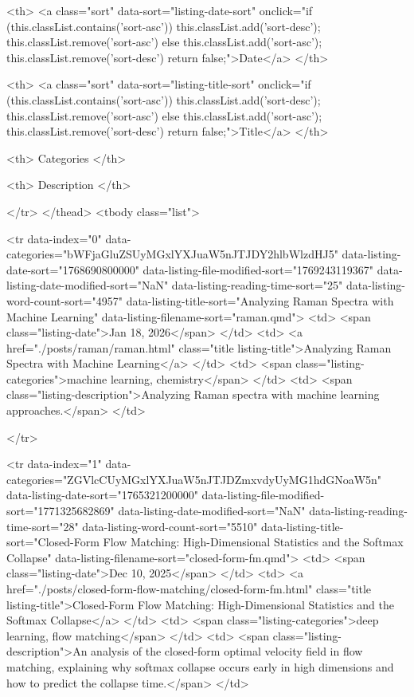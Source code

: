 <th>
<a class="sort" data-sort="listing-date-sort" onclick="if (this.classList.contains('sort-asc')) { this.classList.add('sort-desc'); this.classList.remove('sort-asc') } else { this.classList.add('sort-asc'); this.classList.remove('sort-desc')} return false;">Date</a>
</th>

<th>
<a class="sort" data-sort="listing-title-sort" onclick="if (this.classList.contains('sort-asc')) { this.classList.add('sort-desc'); this.classList.remove('sort-asc') } else { this.classList.add('sort-asc'); this.classList.remove('sort-desc')} return false;">Title</a>
</th>

<th>
Categories
</th>

<th>
Description
</th>

</tr>
</thead>
<tbody class="list">

<tr data-index="0" data-categories="bWFjaGluZSUyMGxlYXJuaW5nJTJDY2hlbWlzdHJ5" data-listing-date-sort="1768690800000" data-listing-file-modified-sort="1769243119367" data-listing-date-modified-sort="NaN" data-listing-reading-time-sort="25" data-listing-word-count-sort="4957" data-listing-title-sort="Analyzing Raman Spectra with Machine Learning" data-listing-filename-sort="raman.qmd">
<td>
<span class="listing-date">Jan 18, 2026</span>
</td>
<td>
<a href="./posts/raman/raman.html" class="title listing-title">Analyzing Raman Spectra with Machine Learning</a>
</td>
<td>
<span class="listing-categories">machine learning, chemistry</span>
</td>
<td>
<span class="listing-description">Analyzing Raman spectra with machine learning approaches.</span>
</td>

</tr>

<tr data-index="1" data-categories="ZGVlcCUyMGxlYXJuaW5nJTJDZmxvdyUyMG1hdGNoaW5n" data-listing-date-sort="1765321200000" data-listing-file-modified-sort="1771325682869" data-listing-date-modified-sort="NaN" data-listing-reading-time-sort="28" data-listing-word-count-sort="5510" data-listing-title-sort="Closed-Form Flow Matching: High-Dimensional Statistics and the Softmax Collapse" data-listing-filename-sort="closed-form-fm.qmd">
<td>
<span class="listing-date">Dec 10, 2025</span>
</td>
<td>
<a href="./posts/closed-form-flow-matching/closed-form-fm.html" class="title listing-title">Closed-Form Flow Matching: High-Dimensional Statistics and the Softmax Collapse</a>
</td>
<td>
<span class="listing-categories">deep learning, flow matching</span>
</td>
<td>
<span class="listing-description">An analysis of the closed-form optimal velocity field in flow matching, explaining why softmax collapse occurs early in high dimensions and how to predict the collapse time.</span>
</td>

